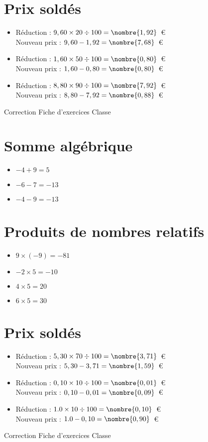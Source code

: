 \documentclass[a4paper,11pt,fleqn]{article}		%
\begin{document}
\section{Prix soldés}
\begin{itemize}

  \item Réduction : $9,60\times20\div100=\nombre{1,92}$~€\\
  Nouveau prix : $9,60-1,92=\nombre{7,68}$~€
  \item Réduction : $1,60\times50\div100=\nombre{0,80}$~€\\
  Nouveau prix : $1,60-0,80=\nombre{0,80}$~€
  \item Réduction : $8,80\times90\div100=\nombre{7,92}$~€\\
  Nouveau prix : $8,80-7,92=\nombre{0,88}$~€
\end{itemize}
\newpage
\setcounter{exo}{0}
\setcounter{section}{0}
{Correction} \hfill {\huge Fiche d'exercices } \hfill {Classe}

\section{Somme algébrique}
\begin{itemize}

  \item $-4 +9=5$
  \item $-6 -7=-13$
  \item $-4 -9=-13$
\end{itemize}

\section{Produits de nombres relatifs}
\begin{itemize}

  \item $9\times(-9)=-81$
  \item $-2\times5=-10$
  \item $4\times5=20$
  \item $6\times5=30$
\end{itemize}

\section{Prix soldés}
\begin{itemize}

  \item Réduction : $5,30\times70\div100=\nombre{3,71}$~€\\
  Nouveau prix : $5,30-3,71=\nombre{1,59}$~€
  \item Réduction : $0,10\times10\div100=\nombre{0,01}$~€\\
  Nouveau prix : $0,10-0,01=\nombre{0,09}$~€
  \item Réduction : $1.0\times10\div100=\nombre{0,10}$~€\\
  Nouveau prix : $1.0-0,10=\nombre{0,90}$~€
\end{itemize}
\newpage
\setcounter{exo}{0}
\setcounter{section}{0}
{Correction} \hfill {\huge Fiche d'exercices } \hfill {Classe}
\end{document}
